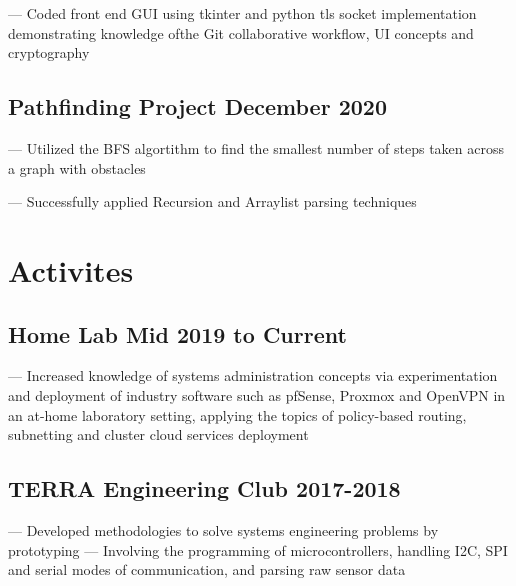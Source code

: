 \documentclass{article}
\begin{document}
--- Coded front end GUI using tkinter and python tls socket implementation demonstrating knowledge ofthe Git collaborative workflow, UI concepts and cryptography
\subsection{Pathfinding Project \hfill \normalfont \normalsize December 2020}
--- Utilized the BFS algortithm to find the smallest number of steps taken across a graph with obstacles

--- Successfully applied Recursion and Arraylist parsing techniques 


\section{Activites}
\subsection{Home Lab \hfill \normalfont \normalsize Mid 2019 to Current}
--- Increased knowledge of systems administration concepts via experimentation and deployment of industry software such as pfSense, Proxmox and OpenVPN in an at-home laboratory setting, applying the topics of policy-based routing, subnetting and cluster cloud services deployment  

\subsection{TERRA Engineering Club \hfill \normalfont \normalsize 2017-2018}
--- Developed methodologies to solve systems engineering problems by prototyping 
--- Involving the programming of microcontrollers, handling I2C, SPI and serial modes of communication, and parsing raw sensor data
\end{document}
